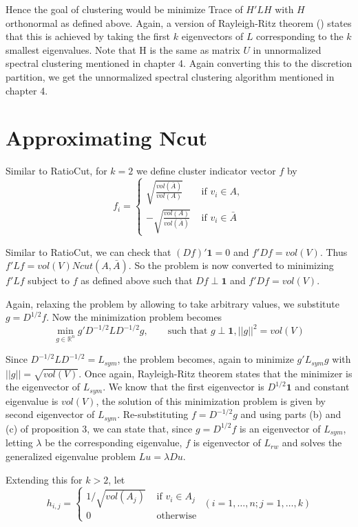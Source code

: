 \documentclass[10pt,a4paper, nocenter]{report}
\newcommand{\norm}[1]{\lvert\lvert {#1} \rvert\rvert}
\begin{document}
	Hence the goal of clustering would be minimize Trace of $H'LH$ with $H$ orthonormal as defined above. Again, a version of Rayleigh-Ritz theorem (\cite{rayleigh-ritz-trace-min}) states that this is achieved by taking the first $k$ eigenvectors of $L$ corresponding to the $k$ smallest eigenvalues. Note that H is the same as matrix $U$ in unnormalized spectral clustering mentioned in chapter 4. Again converting this to the discretion partition, we get the unnormalized spectral clustering algorithm mentioned in chapter 4. 
	
	\section{Approximating Ncut}
	Similar to RatioCut, for $k=2$ we define cluster indicator vector $f$ by $$ f_{i} = \begin{cases}
	\sqrt{\frac{vol(\bar{A})}{vol(A)}} & \text{ if }v_{i} \in A,\\
	-\sqrt{\frac{vol(A)}{vol(\bar{A})}} & \text{ if }v_{i} \in \bar{A}
	\end{cases}$$
	
	Similar to RatioCut, we can check that $(Df)'\mathbf{1} = 0$ and $f'Df = vol(V)$. Thus $f'Lf = vol(V)Ncut(A,\bar{A})$. So the problem is now converted to minimizing $f'Lf$ subject to $f$ as defined above such that $Df \perp \mathbf{1}$ and $f'Df = vol(V)$. 
	
	Again, relaxing the problem by allowing to take arbitrary values, we substitute $g=D^{1/2}f$. Now the minimization problem becomes $$\min_{g\in \mathbb{R}^{n}} g'D^{-1/2}LD^{-1/2}g, \hspace{20pt}\text{ such that } g\perp \mathbf{1}, \norm{g}^{2} = vol(V)$$
	
	Since $D^{-1/2}LD^{-1/2} = L_{sym}$, the problem becomes, again to minimize $g'L_{sym}g$ with $\norm{g} = \sqrt{vol(V)}$. Once again, Rayleigh-Ritz theorem states that the minimizer is the eigenvector of $L_{sym}$. We know that the first eigenvector is $D^{1/2}\mathbf{1}$ and constant eigenvalue is $vol(V)$, the solution of this minimization problem is given by second eigenvector of $L_{sym}$. Re-substituting $f=D^{-1/2}g$ and using parts (b) and (c) of proposition 3, we can state that, since $g=D^{1/2}f$ is an eigenvector of $L_{sym}$, letting $\lambda$ be the corresponding eigenvalue, $f$ is eigenvector of $L_{rw}$ and solves the generalized eigenvalue problem $Lu=\lambda Du$. 
	
	Extending this for $k>2$, let
	$$ h_{i,j} = \begin{cases}
	1/\sqrt{vol(A_{j})} &\text{ if } v_{i}\in A_{j}\\ 0 & \text{ otherwise }
	\end{cases} (i = 1,\dots,n; j=1,\dots,k)$$
	
\end{document}
